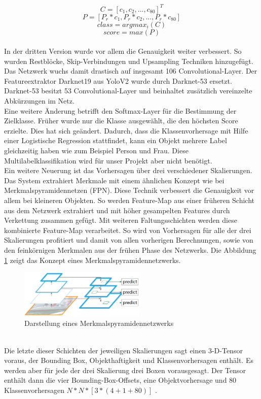 \documentclass[conference]{IEEEtran}
\begin{document}
	\[ C = [c_1, c_2,..., c_{80}]^T\]
	\[ P = [P_r * c_1, P_r * c_2, ..., P_r * c_{80}] \]
	\[ class = argmax_i(C)\]
	\[ score = max(P)\]\\
	In der dritten Version wurde vor allem die Genauigkeit weiter verbessert. So wurden Restblöcke, Skip-Verbindungen und Upsampling Techniken hinzugefügt. Das Netzwerk wuchs damit drastisch auf insgesamt 106 Convolutional-Layer.
	Der Featureextraktor Darknet19 aus YoloV2 wurde durch Darknet-53 ersetzt. Darknet-53 besitzt 53 Convolutional-Layer und beinhaltet zusätzlich vereinzelte Abkürzungen im Netz.\\
	Eine weitere Änderung betrifft den Softmax-Layer für die Bestimmung der Zielklasse. Früher wurde nur die Klasse ausgewählt, die den höchsten Score erzielte. Dies hat sich geändert. Dadurch, dass die Klassenvorhersage mit Hilfe einer Logistische Regression stattfindet, kann ein Objekt mehrere Label gleichzeitig haben wie zum Beispiel Person und Frau. Diese Multilabelklassifikation wird für unser Projekt aber nicht benötigt.\\
	Ein weitere Neuerung ist das Vorhersagen über drei verschiedener Skalierungen. Das System extrahiert Merkmale mit einem ähnlichen Konzept wie bei Merkmalspyramidennetzen (FPN). Diese Technik verbessert die Genauigkeit vor allem bei kleineren Objekten. So werden Feature-Map aus einer früheren Schicht aus dem Netzwerk extrahiert und mit höher gesampelten Features durch Verkettung zusammen gefügt. Mit weiteren Faltungsschichten werden diese kombinierte Feature-Map verarbeitet. So wird von Vorhersagen für alle der drei Skalierungen profitiert und damit von allen vorherigen Berechnungen, sowie von den feinkörnigen Merkmalen aus der frühen Phase des Netzwerks. Die Abbildung \ref{FPN} zeigt das Konzept eines Merkmalspyramidennetzwerks.
	\begin{figure}[!h]
		\begin{center}
			\includegraphics[width=6cm]{Media/FPN.png}
			\caption{Darstellung eines Merkmalspyramidennetzwerks \cite{b6}}
			\label{FPN}
		\end{center}
	\end{figure}\\
	Die letzte dieser Schichten der jeweiligen Skalierungen sagt einen 3-D-Tensor voraus, der Bounding Box, Objekthaftigkeit und Klassenvorhersagen enthält. Es werden aber für jede der drei Skalierung drei Boxen vorausgesagt. Der Tensor enthält dann die vier Bounding-Box-Offsets, eine Objektvorhersage und 80 Klassenvorhersagen $N*N*[3*(4 + 1 + 80)]$ \cite{b4}.\\
\end{document}

